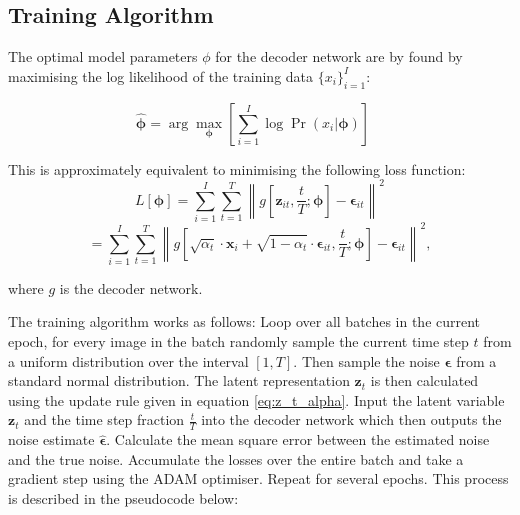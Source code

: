 \documentclass[11pt]{article}
\begin{document}
\subsection{Training Algorithm}
The optimal model parameters $\phi$ for the decoder network are by found by maximising the log likelihood of the training data $\{x_i\}_{i=1}^{I}$:

$$\hat{\boldsymbol{\phi}} = \arg\max_{\boldsymbol{\phi}} \left[ \sum_{i=1}^{I} \log \Pr(x_i | \boldsymbol{\phi}) \right] \quad$$

This is approximately equivalent to minimising the following loss function:
$$
L[\boldsymbol{\phi}] = \sum_{i=1}^{I} \sum_{t=1}^{T} \left\| g[\mathbf{z}_{it}, \frac{t}{T}; \boldsymbol{\phi}] - \boldsymbol{\epsilon}_{it} \right\|^2
$$
\begin{equation}
= \sum_{i=1}^{I} \sum_{t=1}^{T} \left\| g \left[\sqrt{\alpha_t} \cdot \mathbf{x}_i + \sqrt{1 - \alpha_t} \cdot \boldsymbol{\epsilon}_{it}, \frac{t}{T}; \boldsymbol{\phi} \right] - \boldsymbol{\epsilon}_{it} \right\|^2,
\label{eq:loss_function}
\end{equation}

where $g$ is the decoder network.

The training algorithm works as follows: Loop over all batches in the current epoch, for every image in the batch randomly sample the current time step $t$ from a uniform distribution over the interval $[1, T]$. Then sample the noise $\boldsymbol{\epsilon}$ from a standard normal distribution. The latent representation $\boldsymbol{\mathbf{z}}_{t}$ is then calculated using the update rule given in equation \eqref{eq:z_t_alpha}. Input the latent variable $\boldsymbol{\mathbf{z}}_{t}$ and the time step fraction $\frac{t}{T}$ into the decoder network which then outputs the noise estimate $\hat{\boldsymbol{\epsilon}}$. Calculate the mean square error between the estimated noise and the true noise. Accumulate the losses over the entire batch and take a gradient step using the ADAM optimiser. Repeat for several epochs. This process is described in the pseudocode below:
\end{document}
